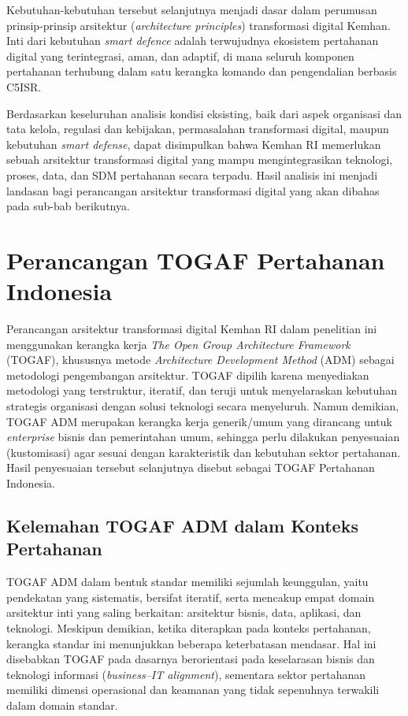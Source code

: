 Kebutuhan-kebutuhan tersebut selanjutnya menjadi dasar dalam perumusan prinsip-prinsip arsitektur (\textit{architecture principles}) transformasi digital Kemhan.
Inti dari kebutuhan \textit{smart defence} adalah terwujudnya ekosistem pertahanan digital yang terintegrasi, aman, dan adaptif, di mana seluruh komponen pertahanan terhubung dalam satu kerangka komando dan pengendalian berbasis C5ISR.

Berdasarkan keseluruhan analisis kondisi eksisting, baik dari aspek organisasi dan tata kelola, regulasi dan kebijakan, permasalahan transformasi digital, maupun kebutuhan \textit{smart defense}, dapat disimpulkan bahwa Kemhan RI memerlukan sebuah arsitektur transformasi digital yang mampu mengintegrasikan teknologi, proses, data, dan SDM pertahanan secara terpadu.
Hasil analisis ini menjadi landasan bagi perancangan arsitektur transformasi digital yang akan dibahas pada sub-bab berikutnya.

\section{Perancangan TOGAF Pertahanan Indonesia}
Perancangan arsitektur transformasi digital Kemhan RI dalam penelitian ini menggunakan kerangka kerja \textit{The Open Group Architecture Framework} (TOGAF), khususnya metode \textit{Architecture Development Method} (ADM) sebagai metodologi pengembangan arsitektur.
TOGAF dipilih karena menyediakan metodologi yang terstruktur, iteratif, dan teruji untuk menyelaraskan kebutuhan strategis organisasi dengan solusi teknologi secara menyeluruh.
Namun demikian, TOGAF ADM merupakan kerangka kerja generik/umum yang dirancang untuk \textit{enterprise} bisnis dan pemerintahan umum, sehingga perlu dilakukan penyesuaian (kustomisasi) agar sesuai dengan karakteristik dan kebutuhan sektor pertahanan.
Hasil penyesuaian tersebut selanjutnya disebut sebagai TOGAF Pertahanan Indonesia.

\subsection{Kelemahan TOGAF ADM dalam Konteks Pertahanan}
TOGAF ADM dalam bentuk standar memiliki sejumlah keunggulan, yaitu pendekatan yang sistematis, bersifat iteratif, serta mencakup empat domain arsitektur inti yang saling berkaitan: arsitektur bisnis, data, aplikasi, dan teknologi.
Meskipun demikian, ketika diterapkan pada konteks pertahanan, kerangka standar ini menunjukkan beberapa keterbatasan mendasar.
Hal ini disebabkan TOGAF pada dasarnya berorientasi pada keselarasan bisnis dan teknologi informasi (\textit{business--IT alignment}), sementara sektor pertahanan memiliki dimensi operasional dan keamanan yang tidak sepenuhnya terwakili dalam domain standar.

